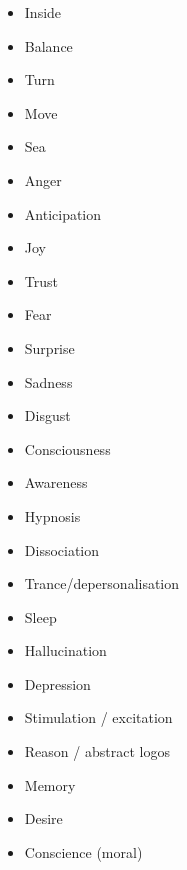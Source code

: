 \begin{multicols}{2}
\begin{itemize}
\item   Inside 

\item   Balance 

\item   Turn 

\item   Move 

\item   Sea 

\item   Anger 

\item   Anticipation 

\item   Joy 

\item   Trust 

\item   Fear 

\item   Surprise 

\item   Sadness 

\item   Disgust 

\item   Consciousness 

\item   Awareness 

\item   Hypnosis 

\item   Dissociation 

\item   Trance/depersonalisation 

\item   Sleep 

\item   Hallucination 

\item   Depression 

\item   Stimulation / excitation 

\item   Reason / abstract logos  

\item   Memory 

\item   Desire 

\item   Conscience (moral) 


\end{itemize}
\end{multicols}
